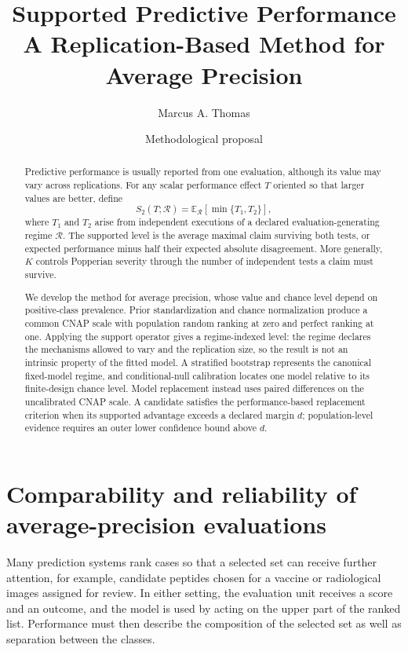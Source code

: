\documentclass[11pt]{article}
\title{Supported Predictive Performance\\
\large A Replication-Based Method for Average Precision}
\author{Marcus A. Thomas}
\date{Methodological proposal}
\newcommand{\Regime}{\mathcal{R}}
\newcommand{\E}{\mathbb{E}}
\theoremstyle{remark}
\begin{document}
\maketitle

\begin{abstract}
Predictive performance is usually reported from one evaluation, although its value may vary across replications. For any scalar performance effect $T$ oriented so that larger values are better, define
\[
S_2(T;\Regime)
=
\E_{\Regime}[\min\{T_1,T_2\}],
\]
where $T_1$ and $T_2$ arise from independent executions of a declared evaluation-generating regime $\Regime$. The supported level is the average maximal claim surviving both tests, or expected performance minus half their expected absolute disagreement. More generally, $K$ controls Popperian severity through the number of independent tests a claim must survive.

We develop the method for average precision, whose value and chance level depend on positive-class prevalence. Prior standardization and chance normalization produce a common CNAP scale with population random ranking at zero and perfect ranking at one. Applying the support operator gives a regime-indexed level: the regime declares the mechanisms allowed to vary and the replication size, so the result is not an intrinsic property of the fitted model. A stratified bootstrap represents the canonical fixed-model regime, and conditional-null calibration locates one model relative to its finite-design chance level. Model replacement instead uses paired differences on the uncalibrated CNAP scale. A candidate satisfies the performance-based replacement criterion when its supported advantage exceeds a declared margin $d$; population-level evidence requires an outer lower confidence bound above $d$.
\end{abstract}

\begingroup
\small
\setlength{\parskip}{0pt}
\tableofcontents
\endgroup
\newpage

\section{Comparability and reliability of average-precision evaluations}
\label{sec:problems}

Many prediction systems rank cases so that a selected set can receive further attention, for example, candidate peptides chosen for a vaccine or radiological images assigned for review. In either setting, the evaluation unit receives a score and an outcome, and the model is used by acting on the upper part of the ranked list. Performance must then describe the composition of the selected set as well as separation between the classes.
\end{document}

